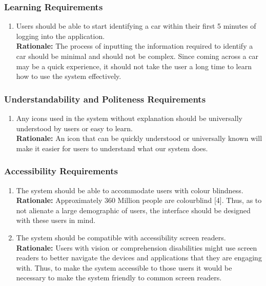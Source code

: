 \documentclass[]{article}
\begin{document}

\subsubsection{Learning Requirements}
\label{ssub:learning_requirements}
\begin{enumerate}[label={UH-L\arabic*.}]
	\item Users should be able to start identifying a car within their first 5 minutes of logging into the application.\\
	\textbf{Rationale:} The process of inputting the information required to identify a car should be minimal and should not be complex. Since coming across a car may be a quick experience, it should not take the user a long time to learn how to use the system effectively.
\end{enumerate}

\subsubsection{Understandability and Politeness Requirements}
\label{ssub:understandability_and_politeness_requirements}
\begin{enumerate}[label={UH-UP\arabic*.}]
	\item Any icons used in the system without explanation should be universally understood by users or easy to learn.\\
	\textbf{Rationale:} An icon that can be quickly understood or universally known will make it easier for users to understand what our system does.
\end{enumerate}

\subsubsection{Accessibility Requirements}
\label{ssub:accessibility_requirements}
\begin{enumerate}[label={UH-A\arabic*.}]
	\item The system should be able to accommodate users with colour blindness.\\
	\textbf{Rationale:} Approximately 360 Million people are colourblind [4]. Thus, as to not alienate a large demographic of users, the interface should be designed with these users in mind.
	\item The system should be compatible with accessibility screen readers.\\
	\textbf{Rationale:} Users with vision or comprehension disabilities might use screen readers to better navigate the devices and applications that they are engaging with. Thus, to make the system accessible to those users it would be necessary to make the system friendly to common screen readers.
\end{enumerate}
\end{document}

